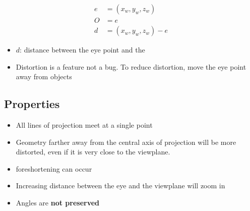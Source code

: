   \begin{align}
    e &= \left( x_{w}, y_{w}, z_{w} \right) \\
    O &= e  \\
    d &= \left( x_{w}, y_{w}, z_{w} \right) - e
  \end{align}

  \begin{itemize}
    \item $ d $: distance between the eye point and the 
    \item Distortion is a feature not a bug. To reduce distortion, move
    the eye point away from objects
  \end{itemize}

  \subsection{Properties}
  \begin{itemize}
    \item All lines of projection meet at a single point
    \item Geometry farther away from the central axis of projection will be
    more distorted, even if it is very close to the viewplane.
    \item \Gls{foreshortening} can occur
    \item Increasing distance between the eye and the viewplane will zoom in
    \item Angles are \textbf{not preserved}
  \end{itemize}
